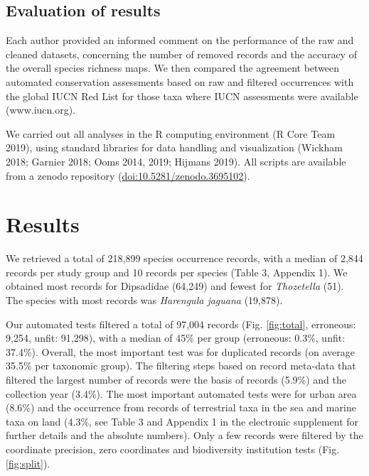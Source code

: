 \documentclass[fleqn,10pt,lineno]{wlpeerj} %
\begin{document}
\hypertarget{evaluation-of-results}{%
\subsection*{Evaluation of results}\label{evaluation-of-results}}

Each author provided an informed comment on the performance of the raw and cleaned datasets, concerning the number of removed records and the accuracy of the overall species richness maps. We then compared the agreement between automated conservation assessments based on raw and filtered occurrences with the global IUCN Red List for those taxa where IUCN assessments were available (www.iucn.org).

We carried out all analyses in the R computing environment (R Core Team 2019), using standard libraries for data handling and visualization (Wickham 2018; Garnier 2018; Ooms 2014, 2019; Hijmans 2019). All scripts are available from a zenodo repository (\url{doi:10.5281/zenodo.3695102}).

\hypertarget{results}{%
\section*{Results}\label{results}}

We retrieved a total of 218,899 species occurrence records, with a median of 2,844 records per study group and 10 records per species (Table 3, Appendix 1). We obtained most records for Dipsadidae (64,249) and fewest for \emph{Thozetella} (51). The species with most records was \emph{Harengula jaguana} (19,878).

Our automated tests filtered a total of 97,004 records (Fig. \ref{fig:total}, erroneous: 9,254, unfit: 91,298), with a median of 45\% per group (erroneous: 0.3\%, unfit: 37.4\%). Overall, the most important test was for duplicated records (on average 35.5\% per taxonomic group). The filtering steps based on record meta-data that filtered the largest number of records were the basis of records (5.9\%) and the collection year (3.4\%). The most important automated tests were for urban area (8.6\%) and the occurrence from records of terrestrial taxa in the sea and marine taxa on land (4.3\%, see Table 3 and Appendix 1 in the electronic supplement for further details and the absolute numbers). Only a few records were filtered by the coordinate precision, zero coordinates and biodiversity institution tests (Fig. \ref{fig:split}).
\end{document}
